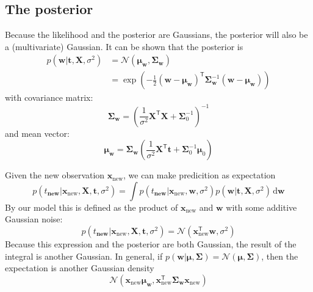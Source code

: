 \documentclass[a4paper,11pt]{article} %
\begin{document}
\subsection{The posterior}
Because the likelihood and the posterior are Gaussians, the posterior will also be
a (multivariate) Gaussian.
It can be shown that the posterior is
\begin{align}
p(\mathbf{w} | \mathbf{t}, \mathbf{X}, \sigma^2) & =
\mathcal{N}(\boldsymbol{\mu}_{\mathbf{w}},\boldsymbol{\Sigma}_{\mathbf{w}}) \\
& = \exp\left(
-\frac{1}{2}(\mathbf{w} - \boldsymbol{\mu}_{\mathbf{w}})^{\mathsf{T}}
\boldsymbol{\Sigma}^{-1}_{\mathbf{w}}
(\mathbf{w} - \boldsymbol{\mu}_{\mathbf{w}})
\right)
\end{align}
with covariance matrix:
\begin{equation}
\boldsymbol{\Sigma}_{\mathbf{w}} = \left(
\frac{1}{\sigma^2}\mathbf{X}^{\mathsf{T}}\mathbf{X} + \boldsymbol{\Sigma}^{-1}_{0}
\right)^{-1}
\end{equation}
and mean vector:
\begin{equation}
\boldsymbol{\mu}_{\mathbf{w}} = \boldsymbol{\Sigma}_{\mathbf{w}}
\left(
\frac{1}{\sigma^2}\mathbf{X}^{\mathsf{T}}\mathbf{t} +
\boldsymbol{\Sigma}_{0}^{-1}\boldsymbol{\mu}_{0}
\right)
\end{equation}

Given the new observation $\mathbf{x}_{\mathrm{new}}$, we can make
predicition as expectation
\begin{equation*}
p(t_{\mathbf{new}} | \mathbf{x}_{\mathrm{new}}, \mathbf{X}, \mathbf{t}, \sigma^2) =
\int p(t_{\mathbf{new}} | \mathbf{x}_{\mathrm{new}}, \mathbf{w}, \sigma^2)
p(\mathbf{w} | \mathbf{t}, \mathbf{X}, \sigma^2)\,\mathrm{d}\mathbf{w}
\end{equation*}
By our model this is defined as the product of $\mathbf{x}_{\mathrm{new}}$
and $\mathbf{w}$ with some additive Gaussian noise:
\begin{equation*}
p(t_{\mathbf{new}} | \mathbf{x}_{\mathrm{new}}, \mathbf{X}, \mathbf{t}, \sigma^2) =
\mathcal{N}(\mathbf{x}_{\mathrm{new}}^{\mathsf{T}}\mathbf{w}, \sigma^2)
\end{equation*}
Because this expression and the posterior are both Gaussian, the result of the
integral is another Gaussian. In general, if
$p(\mathbf{w}|\boldsymbol{\mu},\boldsymbol{\Sigma}) =
\mathcal{N}(\boldsymbol{\mu},\boldsymbol{\Sigma})$, then the expectation
is another Gaussian density
\begin{equation}
\mathcal{N}(\mathbf{x}_{\mathrm{new}}\boldsymbol{\mu}_{\mathbf{w}},
\mathbf{x}_{\mathrm{new}}^{\mathsf{T}}\boldsymbol{\Sigma}_{\mathbf{w}}
\mathbf{x}_{\mathrm{new}})
\end{equation}




\end{document}
